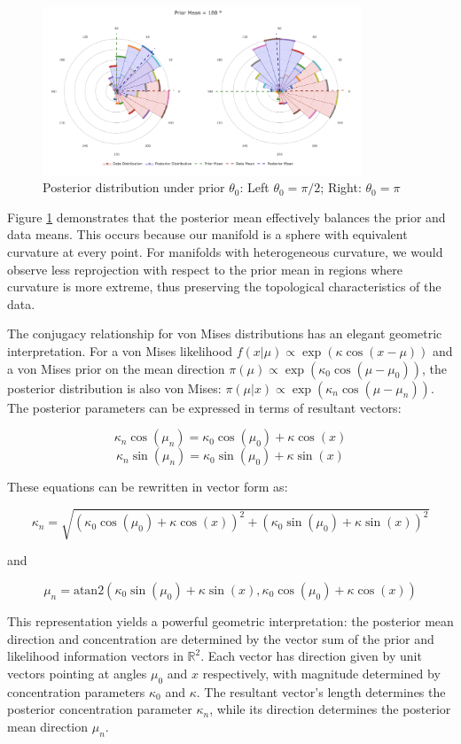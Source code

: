 \documentclass[twoside,11pt]{article}
\begin{document}
\begin{figure}[h!]
  \begin{center}
    \includegraphics[width=0.85\textwidth]{../fig/posterior-roseplot.png}
  \end{center}
  \caption{Posterior distribution under prior $\theta_0$: Left $\theta_0 = \pi/2$; Right: $\theta_0 = \pi$}\label{fig:posteriors}
\end{figure}

Figure \ref{fig:posteriors} demonstrates that the posterior mean effectively balances the prior and data means. This occurs because our manifold is a sphere with equivalent curvature at every point. For manifolds with heterogeneous curvature, we would observe less reprojection with respect to the prior mean in regions where curvature is more extreme, thus preserving the topological characteristics of the data.

The conjugacy relationship for von Mises distributions has an elegant geometric interpretation. For a von Mises likelihood $f(x|\mu) \propto \exp(\kappa \cos(x-\mu))$ and a von Mises prior on the mean direction $\pi(\mu) \propto \exp(\kappa_0 \cos(\mu-\mu_0))$, the posterior distribution is also von Mises: $\pi(\mu|x) \propto \exp(\kappa_n \cos(\mu-\mu_n))$. The posterior parameters can be expressed in terms of resultant vectors:

$$\kappa_n\cos(\mu_n) = \kappa_0\cos(\mu_0) + \kappa\cos(x)$$
$$\kappa_n\sin(\mu_n) = \kappa_0\sin(\mu_0) + \kappa\sin(x)$$

These equations can be rewritten in vector form as:

$$\kappa_n = \sqrt{(\kappa_0\cos(\mu_0) + \kappa\cos(x))^2 + (\kappa_0\sin(\mu_0) + \kappa\sin(x))^2}$$

and 

$$\mu_n = \text{atan2}(\kappa_0\sin(\mu_0) + \kappa\sin(x), \kappa_0\cos(\mu_0) + \kappa\cos(x))$$

This representation yields a powerful geometric interpretation: the posterior mean direction and concentration are determined by the vector sum of the prior and likelihood information vectors in $\mathbb{R}^2$. Each vector has direction given by unit vectors pointing at angles $\mu_0$ and $x$ respectively, with magnitude determined by concentration parameters $\kappa_0$ and $\kappa$. The resultant vector's length determines the posterior concentration parameter $\kappa_n$, while its direction determines the posterior mean direction $\mu_n$. 
\end{document}
